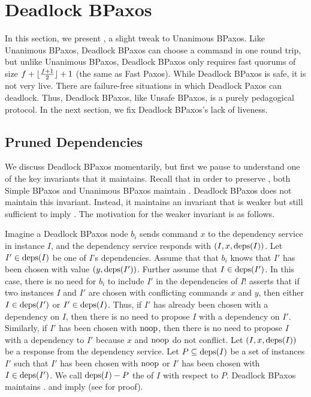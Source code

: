 \section{Deadlock BPaxos}
In this section, we present , a slight tweak to
Unanimous BPaxos. Like Unanimous BPaxos, Deadlock BPaxos can choose a command
in one round trip, but unlike Unanimous BPaxos, Deadlock BPaxos only requires
fast quorums of size $f + \lfloor\frac{f + 1}{2}\rfloor + 1$ (the same as Fast Paxos).
%
While Deadlock BPaxos is safe, it is not very live. There are failure-free
situations in which Deadlock Paxos can deadlock. Thus, Deadlock BPaxos, like
Unsafe BPaxos, is a purely pedagogical protocol. In the next section, we fix
Deadlock BPaxos's lack of liveness.

\subsection{Pruned Dependencies}
We discuss Deadlock BPaxos momentarily, but first we pause to understand one of
the key invariants that it maintains. Recall that in order to preserve
, both Simple BPaxos and Unanimous BPaxos maintain
.
%
Deadlock BPaxos does not maintain this invariant. Instead, it maintains an
invariant that is weaker but still sufficient to imply
. The motivation for the weaker invariant is as
follows.

Imagine a Deadlock BPaxos node $b_i$ sends command $x$ to the dependency
service in instance $I$, and the dependency service responds with $(I, x,
\text{deps}(I))$. Let $I' \in \text{deps}(I)$ be one of $I$'s dependencies. Assume that
that $b_i$ knows that $I'$ has been chosen with value $(y, \text{deps}(I'))$. Further
assume that $I \in \text{deps}(I')$. In this case, there is no need for $b_i$ to
include $I'$ in the dependencies of $I$!  asserts
that if two instances $I$ and $I'$ are chosen with conflicting commands $x$ and
$y$, then either $I \in \text{deps}(I')$ or $I' \in \text{deps}(I)$. Thus, if $I'$ has
already been chosen with a dependency on $I$, then there is no need to propose
$I$ with a dependency on $I'$.
%
Similarly, if $I'$ has been chosen with $\text{noop}$, then there is no need to
propose $I$ with a dependency to $I'$ because $x$ and $\text{noop}$ do not conflict.
%
Let $(I, x, \text{deps}(I))$ be a response from the dependency service. Let $P
\subseteq \text{deps}(I)$ be a set of instances $I'$ such that $I'$ has been chosen
with $\text{noop}$ or $I'$ has been chosen with $I \in \text{deps}(I')$. We call $\text{deps}(I)
- P$ the  of $I$ with respect to $P$. Deadlock
BPaxos maintains .  and
 imply  (see
 for proof).

